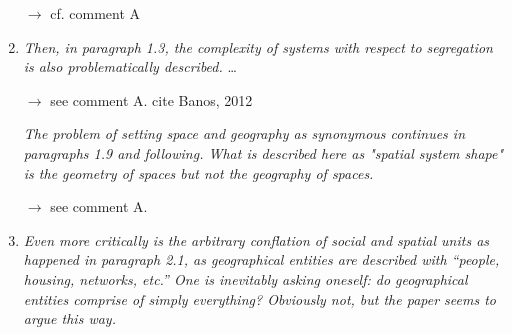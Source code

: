 \documentclass[11pt,a4paper,sans]{moderncv}        %
\begin{document}
\begin{enumerate}
 $\rightarrow$ cf. comment A
 
 \medskip

  

  \item \textit{Then, in paragraph 1.3, the complexity of systems with respect to segregation is also problematically described.} \ldots
  
  $\rightarrow$ see comment A. cite Banos, 2012

  \medskip

  \textit{The problem of setting space and geography as synonymous continues in paragraphs 1.9 and following. What is described here as "spatial system shape" is the geometry of spaces but not the geography of spaces.}
  
  $\rightarrow$ see comment A. 

  \medskip

  \item \textit{Even more critically is the arbitrary conflation of social and spatial units as happened in paragraph 2.1, as geographical entities are described with “people, housing, networks, etc.” One is inevitably asking oneself: do geographical entities comprise of simply everything? Obviously not, but the paper seems to argue this way.}
  

\end{enumerate}
\end{document}
